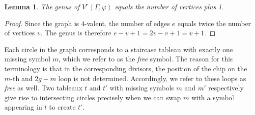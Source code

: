 \documentclass[11pt,reqno]{amsart}
\theoremstyle{definition}
\theoremstyle{problem}
\theoremstyle{plain}
\newtheorem{theorem}[definition]{Theorem}
\newtheorem{lemma}[definition]{Lemma}
\theoremstyle{remark}
\theoremstyle{theorem}
\numberwithin{equation}{section}
\numberwithin{figure}{section}
\theoremstyle{definition}
\theoremstyle{problem}
\theoremstyle{plain}
\begin{document}
 \begin{lemma} \label{genuslemma}
	The genus of $V^r(\Gamma,\varphi)$ equals the number of vertices plus 1.
\end{lemma}

\begin{proof}
	Since the graph is $4$-valent, the number of edges $e$ equals twice the number of vertices $v$. The genus is therefore $e-v+1 = 2v-v+1=v+1$. 
\end{proof}

Each circle in the graph corresponds to a staircase tableau with exactly one missing symbol $m$, which we refer to as the \emph{free} symbol.  The reason for this terminology is that in the corresponding divisors, the position of the chip on the $m$-th and $2g-m$ loop is not determined. Accordingly, we refer to these loops as \emph{free} as well. 
Two tableaux $t$ and $t'$ with missing symbols $m$ and $m'$ respectively give rise to intersecting circles precisely when we can swap $m$ with a symbol appearing in $t$ to create $t'$. 

%







\end{document}
